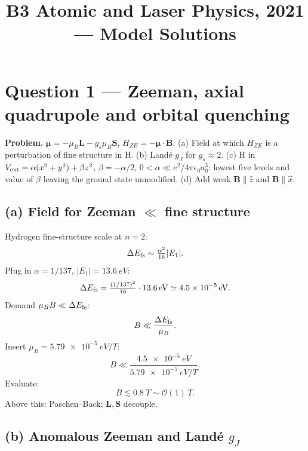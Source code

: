 \documentclass[11pt]{article}
\title{B3 Atomic and Laser Physics, 2021 --- Model Solutions}
\author{}
\date{}
\begin{document}
\maketitle

\section*{Question 1 --- Zeeman, axial quadrupole and orbital quenching}

\textbf{Problem.} $\bm\mu=-\mu_B\bm L-g_s\mu_B\bm S$, $H_{ZE}=-\bm\mu\cdot\bm B$. (a) Field at which $H_{ZE}$ is a perturbation of fine structure in H. (b) Land\'e $g_J$ for $g_s\!\approx\!2$. (c) H in $V_{\rm ext}=\alpha(x^2+y^2)+\beta z^2$, $\beta=-\alpha/2$, $0<\alpha\ll e^2/4\pi\epsilon_0 a_0^3$: lowest five levels and value of $\beta$ leaving the ground state unmodified. (d) Add weak $\bm B\parallel\hat z$ and $\bm B\parallel\hat x$.

\subsection*{(a) Field for Zeeman $\ll$ fine structure}

Hydrogen fine-structure scale at $n=2$:
\[
\Delta E_{\rm fs}\sim\tfrac{\alpha^2}{16}|E_1|.
\]
Plug in $\alpha=1/137$, $|E_1|=\SI{13.6}{eV}$:
\[
\Delta E_{\rm fs}=\tfrac{(1/137)^2}{16}\cdot\SI{13.6}{eV}\simeq\SI{4.5e-5}{eV}.
\]
Demand $\mu_B B\ll\Delta E_{\rm fs}$:
\[
B\ll\frac{\Delta E_{\rm fs}}{\mu_B}.
\]
Insert $\mu_B=\SI{5.79e-5}{eV/T}$:
\[
B\ll\frac{\SI{4.5e-5}{eV}}{\SI{5.79e-5}{eV/T}}.
\]
Evaluate:
\begin{equation}
\boxed{\;B\lesssim\SI{0.8}{T}\sim\mathcal O(1)\,\si{T}.\;}
\label{eq:Bcrit}
\end{equation}
Above this: Paschen--Back; $\bm L,\bm S$ decouple.

\subsection*{(b) Anomalous Zeeman and Land\'e $g_J$}
\end{document}
